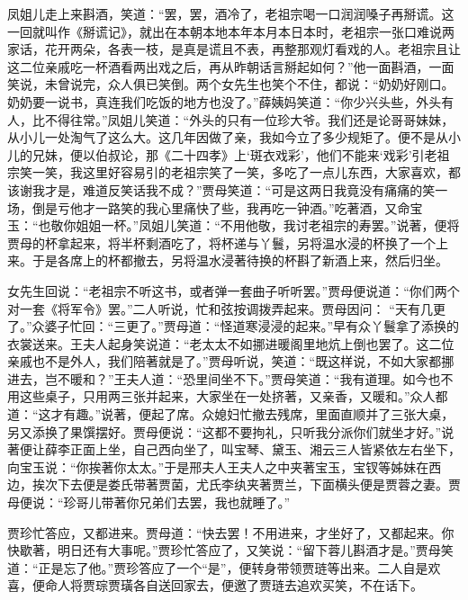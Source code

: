 \begin{parag}
    凤姐儿走上来斟酒，笑道：“罢，罢，酒冷了，老祖宗喝一口润润嗓子再掰谎。这一回就叫作《掰谎记》，就出在本朝本地本年本月本日本时，老祖宗一张口难说两家话，花开两朵，各表一枝，是真是谎且不表，再整那观灯看戏的人。老祖宗且让这二位亲戚吃一杯酒看两出戏之后，再从昨朝话言掰起如何？”他一面斟酒，一面笑说，未曾说完，众人俱已笑倒。两个女先生也笑个不住，都说：“奶奶好刚口。奶奶要一说书，真连我们吃饭的地方也没了。”薛姨妈笑道：“你少兴头些，外头有人，比不得往常。”凤姐儿笑道：“外头的只有一位珍大爷。我们还是论哥哥妹妹，从小儿一处淘气了这么大。这几年因做了亲，我如今立了多少规矩了。便不是从小儿的兄妹，便以伯叔论，那《二十四孝》上‘斑衣戏彩’，他们不能来‘戏彩’引老祖宗笑一笑，我这里好容易引的老祖宗笑了一笑，多吃了一点儿东西，大家喜欢，都该谢我才是，难道反笑话我不成？”贾母笑道：“可是这两日我竟没有痛痛的笑一场，倒是亏他才一路笑的我心里痛快了些，我再吃一钟酒。”吃著酒，又命宝玉：“也敬你姐姐一杯。”凤姐儿笑道：“不用他敬，我讨老祖宗的寿罢。”说著，便将贾母的杯拿起来，将半杯剩酒吃了，将杯递与丫鬟，另将温水浸的杯换了一个上来。于是各席上的杯都撤去，另将温水浸著待换的杯斟了新酒上来，然后归坐。
\end{parag}


\begin{parag}
    女先生回说：“老祖宗不听这书，或者弹一套曲子听听罢。”贾母便说道：“你们两个对一套《将军令》罢。”二人听说，忙和弦按调拨弄起来。贾母因问： “天有几更了。”众婆子忙回：“三更了。”贾母道：“怪道寒浸浸的起来。”早有众丫鬟拿了添换的衣裳送来。王夫人起身笑说道：“老太太不如挪进暖阁里地炕上倒也罢了。这二位亲戚也不是外人，我们陪著就是了。”贾母听说，笑道：“既这样说，不如大家都挪进去，岂不暖和？”王夫人道：“恐里间坐不下。”贾母笑道：“我有道理。如今也不用这些桌子，只用两三张并起来，大家坐在一处挤著，又亲香，又暖和。”众人都道：“这才有趣。”说著，便起了席。众媳妇忙撤去残席，里面直顺并了三张大桌，另又添换了果馔摆好。贾母便说：“这都不要拘礼，只听我分派你们就坐才好。”说著便让薛李正面上坐，自己西向坐了，叫宝琴、黛玉、湘云三人皆紧依左右坐下，向宝玉说：“你挨著你太太。”于是邢夫人王夫人之中夹著宝玉，宝钗等姊妹在西边，挨次下去便是娄氏带著贾菌，尤氏李纨夹著贾兰，下面横头便是贾蓉之妻。贾母便说：“珍哥儿带著你兄弟们去罢，我也就睡了。”
\end{parag}


\begin{parag}
    贾珍忙答应，又都进来。贾母道：“快去罢！不用进来，才坐好了，又都起来。你快歇著，明日还有大事呢。”贾珍忙答应了，又笑说：“留下蓉儿斟酒才是。”贾母笑道：“正是忘了他。”贾珍答应了一个“是”，便转身带领贾琏等出来。二人自是欢喜，便命人将贾琮贾璜各自送回家去，便邀了贾琏去追欢买笑，不在话下。
\end{parag}


